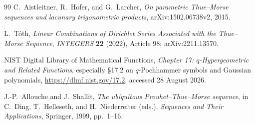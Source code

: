 \documentclass[11pt,oneside]{article}
\theoremstyle{definition}
\theoremstyle{remark}
\begin{document}
\begin{thebibliography}{99}
C.~Aistleitner, R.~Hofer, and G.~Larcher,
\emph{On parametric Thue--Morse sequences and lacunary trigonometric products},
arXiv:1502.06738v2, 2015.

L.~T\'oth,
\emph{Linear Combinations of Dirichlet Series Associated with the Thue--Morse
Sequence}, \emph{INTEGERS} \textbf{22} (2022), Article 98;
arXiv:2211.13570.

NIST Digital Library of Mathematical Functions,
\emph{Chapter 17: \(q\)-Hypergeometric and Related Functions}, especially
\S17.2 on \(q\)-Pochhammer symbols and Gaussian polynomials,
\url{https://dlmf.nist.gov/17.2}, accessed 28 August 2026.

J.-P.~Allouche and J.~Shallit,
\emph{The ubiquitous Prouhet--Thue--Morse sequence}, in
C.~Ding, T.~Helleseth, and H.~Niederreiter (eds.),
\emph{Sequences and Their Applications}, Springer, 1999, pp.~1--16.

\end{thebibliography}
\end{document}
